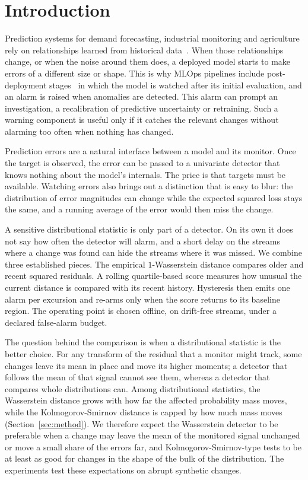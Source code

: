 \documentclass[preprint,12pt]{elsarticle}
\begin{document}
\section{Introduction}
\label{sec:intro}
Prediction systems for demand forecasting, industrial monitoring and agriculture rely on relationships learned from historical data~\cite{douaioui2024machine,Ge2017DataMA,grazieschi2025soilcast}. When those relationships change, or when the noise around them does, a deployed model starts to make errors of a different size or shape. This is why MLOps pipelines include post-deployment stages~\cite{antonini2022tiny} in which the model is watched after its initial evaluation, and an alarm is raised when anomalies are detected. This alarm can prompt an investigation, a recalibration of predictive uncertainty or retraining. Such a warning component is useful only if it catches the relevant changes without alarming too often when nothing has changed.

Prediction errors are a natural interface between a model and its monitor. Once the target is observed, the error can be passed to a univariate detector that knows nothing about the model's internals. The price is that targets must be available. Watching errors also brings out a distinction that is easy to blur: the distribution of error magnitudes can change while the expected squared loss stays the same, and a running average of the error would then miss the change.

A sensitive distributional statistic is only part of a detector. On its own it does not say how often the detector will alarm, and a short delay on the streams where a change was found can hide the streams where it was missed. We combine three established pieces. The empirical $1$-Wasserstein distance compares older and recent squared residuals. A rolling quartile-based score measures how unusual the current distance is compared with its recent history. Hysteresis then emits one alarm per excursion and re-arms only when the score returns to its baseline region. The operating point is chosen offline, on drift-free streams, under a declared false-alarm budget.

The question behind the comparison is when a distributional statistic is the better choice. For any transform of the residual that a monitor might track, some changes leave its mean in place and move its higher moments; a detector that follows the mean of that signal cannot see them, whereas a detector that compares whole distributions can. Among distributional statistics, the Wasserstein distance grows with how far the affected probability mass moves, while the Kolmogorov-Smirnov distance is capped by how much mass moves (Section~\ref{sec:method}). We therefore expect the Wasserstein detector to be preferable when a change may leave the mean of the monitored signal unchanged or move a small share of the errors far, and Kolmogorov-Smirnov-type tests to be at least as good for changes in the shape of the bulk of the distribution. The experiments test these expectations on abrupt synthetic changes.
\end{document}
